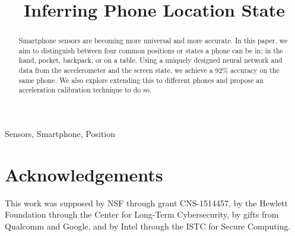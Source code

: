 \documentclass[conference]{IEEEtran}
\begin{document}
\title{Inferring Phone Location State}

\author{
\and
{}
\and
{}
\and
{}
}


\maketitle


\begin {abstract}Smartphone sensors are becoming more universal and more accurate. In this paper, we aim to distinguish between four common positions or states a phone can be in: in the hand, pocket, backpack, or on a table. Using a uniquely designed neural network and data from the accelerometer and the screen state, we achieve a 92\% accuracy on the same phone. We also explore extending this to different phones and propose an acceleration calibration technique to do so. 
\end{abstract}

\begin{IEEEkeywords}
Sensors, Smartphone, Position
\end{IEEEkeywords}








\section*{Acknowledgements}

This work was supposed by NSF through grant CNS-1514457,
by the Hewlett Foundation through the Center for Long-Term Cybersecurity,
by gifts from Qualcomm and Google, and by Intel through the
ISTC for Secure Computing.

\nocite{}

\vfill

{\small
}
\end{document}
